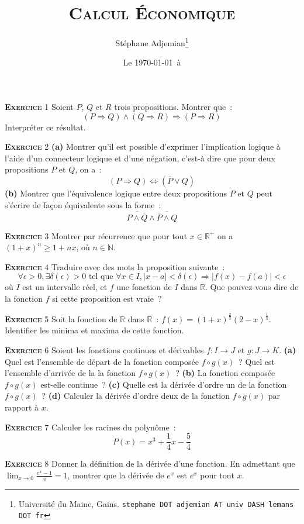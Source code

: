 \documentclass[10pt,a4paper,notitlepage]{article}
\newcommand{\exercice}[1]{\textsc{\textbf{Exercice}} #1}
\begin{document}
\title{\textsc{Calcul Économique}}
\author{Stéphane Adjemian\thanks{Université du Maine, Gains. \texttt{stephane DOT adjemian AT univ DASH lemans DOT fr}}}
\date{Le \today\ à \thistime}

\maketitle

\exercice{1} Soient $P$, $Q$ et $R$ trois propositions. Montrer que :
	\[
		(P \Rightarrow Q) \land (Q \Rightarrow R) \Rightarrow (P \Rightarrow R)
	\]
	Interpréter ce résultat.
	
\bigskip

\exercice{2} \textbf{(a)} Montrer qu'il est possible d'exprimer l'implication
logique à l'aide d'un connecteur logique et d'une négation, c'est-à
dire que pour deux propositions $P$ et $Q$, on a :
\[
  (P \Rightarrow Q) \Leftrightarrow (\overline{P} \lor Q)
\]
\textbf{(b)} Montrer que l'équivalence logique entre deux propositions
$P$ et $Q$ peut s'écrire de façon équivalente sous la forme :
\[
  \overline{P \land \overline{Q}} \land \overline{\overline{P} \land Q}
\]

\bigskip

\exercice{3} Montrer par récurrence que pour tout $x\in \mathbb R^+$ on a $(1+x)^n \geq 1+nx$, où $n\in \mathbb N$.

\bigskip

\exercice{4} Traduire avec des mots la proposition suivante :
\[
\forall \epsilon>0, \exists \delta(\epsilon)>0 \text{ tel que } \forall x \in I,  |x-a|<\delta(\epsilon) \Rightarrow |f(x)-f(a)|<\epsilon   
\]
où $I$ est un intervalle réel, et $f$ une fonction de $I$ dans
$\mathbb R$. Que pouvez-vous dire de la fonction $f$ si cette
proposition est vraie ?

\bigskip

\exercice{5} Soit la fonction de $\mathbb R$ dans $\mathbb R$ :
$f(x) = (1+x)^{\frac{2}{3}}(2-x)^{\frac{1}{3}}$. Identifier les minima
et maxima de cette fonction.
 
\bigskip

\exercice{6} Soient les fonctions continues et dérivables
$f: I\rightarrow J$ et $g: J\rightarrow K$. \textbf{(a)} Quel est
l'ensemble de départ de la fonction composée $f \circ g (x)$ ? Quel
est l'ensemble d'arrivée de la la fonction $f \circ g (x)$ ?
\textbf{(b)} La fonction composée $f \circ g (x)$ est-elle continue ?
\textbf{(c)} Quelle est la dérivée d'ordre un de la fonction
$f \circ g (x)$ ? \textbf{(d)} Calculer la dérivée d'ordre deux de la
fonction $f \circ g (x)$ par rapport à $x$.

\bigskip

\exercice{7} Calculer les racines du polynôme :
\[
P(x) = x^3 + \frac{1}{4}x - \frac{5}{4}
\]    

\bigskip

\exercice{8} Donner la définition de la dérivée d'une fonction. En admettant que $\lim_{x \rightarrow 0}\frac{e^x-1}{x} = 1$, montrer que la dérivée de $e^x$ est $e^x$ pour tout $x$.
\end{document}
